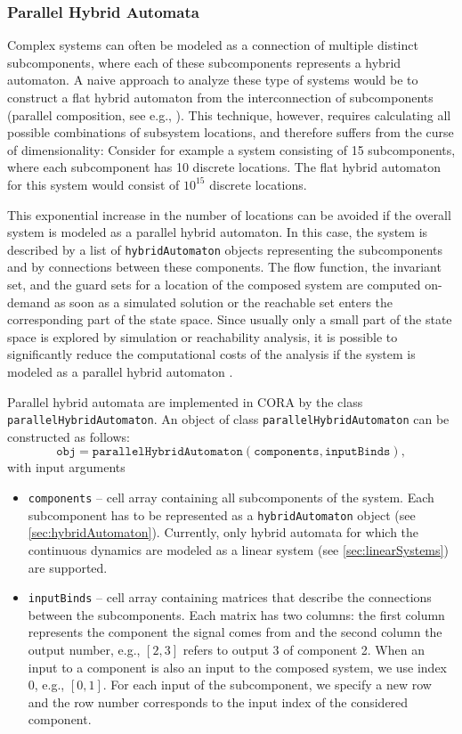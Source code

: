 \subsubsection{Parallel Hybrid Automata} \label{sec:parallelHybridAutomata}

Complex systems can often be modeled as a connection of multiple distinct subcomponents, where each of these subcomponents represents a hybrid automaton. A naive approach to analyze these type of systems would be to construct a flat hybrid automaton from the interconnection of subcomponents (parallel composition, see e.g., \cite[Def.~2.9]{Frehse2005}). This technique, however, requires calculating all possible combinations of subsystem locations, and therefore suffers from the curse of dimensionality: Consider for example a system consisting of 15 subcomponents, where each subcomponent has 10 discrete locations. The flat hybrid automaton for this system would consist of $10^{15}$ discrete locations.

This exponential increase in the number of locations can be avoided if the overall system is modeled as a parallel hybrid automaton. In this case, the system is described by a list of \texttt{hybridAutomaton} objects representing the subcomponents and by connections between these components. The flow function, the invariant set, and the guard sets for a location of the composed system are computed on-demand as soon as a simulated solution or the reachable set enters the corresponding part of the state space. Since usually only a small part of the state space is explored by simulation or reachability analysis, it is possible to significantly reduce the computational costs of the analysis if the system is modeled as a parallel hybrid automaton \cite{Lee2015}. 

Parallel hybrid automata are implemented in CORA by the class \texttt{parallelHybridAutomaton}. An object of class \texttt{parallelHybridAutomaton} can be constructed as follows:
\begin{equation*}
	\texttt{obj} = \texttt{parallelHybridAutomaton}(\texttt{components},\texttt{inputBinds}),
\end{equation*}
with input arguments 
\begin{itemize}
  \item \texttt{components} -- cell array containing all subcomponents of the system. Each subcomponent has to be represented as a \texttt{hybridAutomaton} object (see \cref{sec:hybridAutomaton}). Currently, only hybrid automata for which the continuous dynamics are modeled as a linear system (see \cref{sec:linearSystems}) are supported.
  \item \texttt{inputBinds} -- cell array containing matrices that describe the connections between the subcomponents. Each matrix has two columns: the first column represents the component the signal comes from and the second column the output number, e.g., $[2, 3]$ refers to output 3 of component 2. When an input to a component is also an input to the composed system, we use index 0, e.g., $[0,1]$. For each input of the subcomponent, we specify a new row and the row number corresponds to the input index of the considered component. 
\end{itemize}
  
